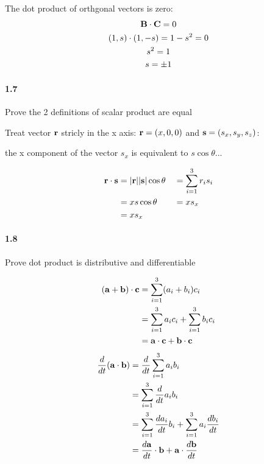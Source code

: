 \documentclass[../problems.tex]{subfiles}
\begin{document}
The dot product of orthgonal vectors is zero: 
\begin{gather*}
    \mathbf{B} \cdot \mathbf{C} = 0 \\
    (1, s) \cdot (1, -s) = 1 - s^2 = 0 \\
    s^2 = 1 \\
    s = \pm 1
\end{gather*}

\paragraph{1.7}
Prove the 2 definitions of scalar product are equal
\barh

Treat vector $\mathbf{r}$ stricly in the x axis: $\mathbf{r} = (x,0,0)$ and $\mathbf{s} 
= (s_x, s_y, s_z)$:
\begin{figure}[ht]
    \centering
    \def\svgwidth{170px}
    
    \caption{}
\end{figure}

the x component of the vector $s_x$ is equivalent to $s \cos{\theta}$... 

\begin{align*}
    \mathbf{r}\cdot \mathbf{s} &= |\mathbf{r}| |\mathbf{s}| \cos{\theta} & &=\sum_{i=1}^3 r_i s_i\\
    &= x s \cos{\theta}  &  &= x s_x\\
    &= x s_x 
\end{align*}

\paragraph{1.8}
Prove dot product is distributive and differentiable
\barh

\begin{align*}
    (\mathbf{a}+\mathbf{b})\cdot \mathbf{c} &= \sum_{i=1}^3 (a_i + b_i) c_i \\
    &= \sum_{i=1}^3 a_i c_i + \sum_{i=1}^3 b_i c_i \\
    &= \mathbf{a}\cdot \mathbf{c} + \mathbf{b}\cdot \mathbf{c}
\end{align*}
\begin{align*}
    \frac{d}{dt} (\mathbf{a}\cdot \mathbf{b}) &= \frac{d}{dt} \sum_{i=1}^3 a_i b_i \\
    &= \sum_{i=1}^3 \frac{d}{dt} a_i b_i \\
    &= \sum_{i=1}^3 \frac{da_i}{dt} b_i + \sum_{i=1}^3 a_i \frac{db_i}{dt} \\
    &= \frac{d\mathbf{a}}{dt} \cdot \mathbf{b} + \mathbf{a} \cdot \frac{d\mathbf{b}}{dt}
\end{align*}
\end{document}
